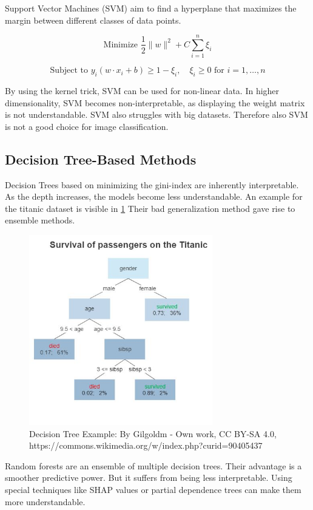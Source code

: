 Support Vector Machines (SVM) aim to find a hyperplane that maximizes the margin between different classes of data points.

$$\text{Minimize } \frac{1}{2} \|w\|^2 + C \sum_{i=1}^{n} \xi_i$$

$$\text{Subject to } y_i (w \cdot x_i + b) \geq 1 - \xi_i, \quad \xi_i \geq 0 \text{ for } i = 1, \ldots, n$$

By using the kernel trick, SVM can be used for non-linear data. In higher dimensionality, SVM becomes non-interpretable, as displaying the weight matrix is not understandable. SVM also struggles with big datasets. Therefore also SVM is not a good choice for image classification.


\subsection{Decision Tree-Based Methods}
\label{decision_tree}
Decision Trees based on minimizing the gini-index are inherently interpretable. As the depth increases, the models become less understandable. An example for the titanic dataset is visible in \ref{fig:decision_tree} Their bad generalization method gave rise to ensemble methods.

\begin{figure}[h!]
	\centering
	\includegraphics[width=80mm]{figs/Decision_Tree}
	\caption{Decision Tree Example: By Gilgoldm - Own work, CC BY-SA 4.0, https://commons.wikimedia.org/w/index.php?curid=90405437}
	\label{fig:decision_tree}
\end{figure}
 

Random forests are an ensemble of multiple decision trees. Their advantage is a smoother predictive power. But it suffers from being less interpretable. Using special techniques like SHAP values \cite{lundberg2017unified} or partial dependence trees can make them more understandable.

